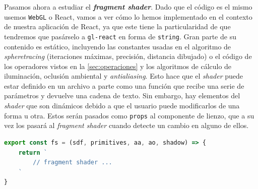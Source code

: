 Pasamos ahora a estudiar el \textbf{\textit{fragment shader}}. Dado que el código es el mismo usemos \texttt{WebGL} o React, vamos a ver cómo lo hemos implementado en el contexto de nuestra aplicación de React, ya que este tiene la particularidad de que tendremos que pasárselo a \texttt{gl-react} en forma de \texttt{string}. Gran parte de su contenido es estático, incluyendo las constantes usadas en el algoritmo de \textit{spheretracing} (iteraciones máximas, precisión, distancia dibujado) o el código de los operadores vistos en la \autoref{sec:operaciones} y los algoritmos de cálculo de iluminación, oclusión ambiental y \textit{antialiasing}. Esto hace que el \textit{shader} puede estar definido en un archivo a parte como una función que recibe una serie de parámetros y devuelve una cadena de texto. Sin embargo, hay elementos del \textit{shader} que son dinámicos debido a que el usuario puede modificarlos de una forma u otra. Estos serán pasados como \texttt{props} al componente de lienzo, que a su vez los pasará al \textit{fragment shader} cuando detecte un cambio en alguno de ellos.
\begin{lstlisting}[language=JavaScript, caption=Definición del procesador de fragmentos]
export const fs = (sdf, primitives, aa, ao, shadow) => {
    return `
        // fragment shader ...
    `
}
\end{lstlisting}

